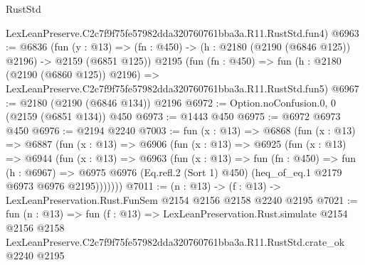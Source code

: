 \begin{lexlean}{RustStd}
\begin{coremodule}
    LexLeanPreserve.C2c7f9f75fe57982dda320760761bba3a.R11.RustStd.fun4)
@6963 := @6836
    (fun (y : @13) => (fn : @450) -> (h : @2180 (@2190 (@6846 @125)) @2196) -> @2159 (@6851 @125))
    @2195
    (fun (fn : @450) =>
    fun (h : @2180 (@2190 (@6860 @125)) @2196) =>
    LexLeanPreserve.C2c7f9f75fe57982dda320760761bba3a.R11.RustStd.fun5)
@6967 := @2180 (@2190 (@6846 @134)) @2196
@6972 := Option.noConfusion.{0, 0} (@2159 (@6851 @134)) @450
@6973 := @1443 @450
@6975 := @6972 @6973 @450
@6976 := @2194 @2240
@7003 := fun (x : @13) =>
  @6868
    (fun (x : @13) =>
    @6887
      (fun (x : @13) =>
      @6906
        (fun (x : @13) =>
        @6925
          (fun (x : @13) =>
          @6944
            (fun (x : @13) =>
            @6963
              (fun (x : @13) =>
              fun (fn : @450) =>
              fun (h : @6967) =>
              @6975 @6976 (Eq.refl.{2} (Sort 1) @450) (heq_of_eq.{1} @2179 @6973 @6976 @2195)))))))
@7011 := (n : @13) -> (f : @13) -> LexLeanPreservation.Rust.FunSem @2154 @2156 @2158 @2240 @2195
@7021 := fun (n : @13) =>
  fun (f : @13) =>
  LexLeanPreservation.Rust.simulate
    @2154
    @2156
    @2158
    LexLeanPreserve.C2c7f9f75fe57982dda320760761bba3a.R11.RustStd.crate_ok
    @2240
    @2195
\end{coremodule}
\end{lexlean}
